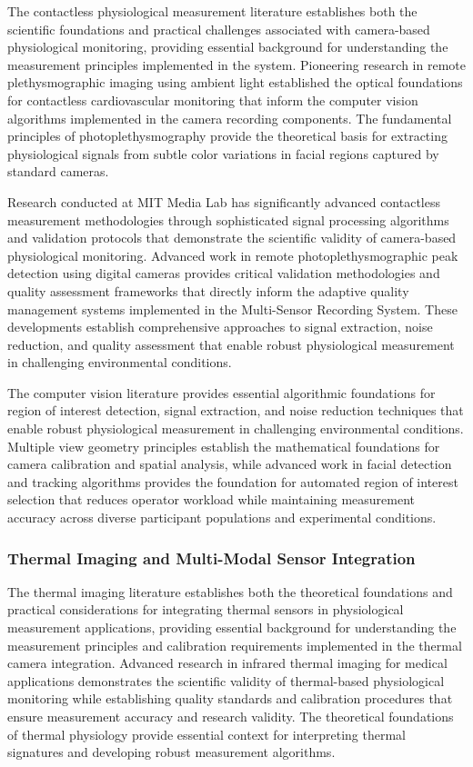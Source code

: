 \documentclass[11pt,a4paper]{article}
\begin{document}
The contactless physiological measurement literature establishes both the scientific foundations and practical
challenges associated with camera-based physiological monitoring, providing essential background for understanding the
measurement principles implemented in the system. Pioneering research in remote plethysmographic imaging using ambient
light established the optical foundations for contactless cardiovascular monitoring that inform the computer vision
algorithms implemented in the camera recording components. The fundamental principles of photoplethysmography provide
the theoretical basis for extracting physiological signals from subtle color variations in facial regions captured by
standard cameras.

Research conducted at MIT Media Lab has significantly advanced contactless measurement methodologies through
sophisticated signal processing algorithms and validation protocols that demonstrate the scientific validity of
camera-based physiological monitoring. Advanced work in remote photoplethysmographic peak detection using digital
cameras provides critical validation methodologies and quality assessment frameworks that directly inform the adaptive
quality management systems implemented in the Multi-Sensor Recording System. These developments establish comprehensive
approaches to signal extraction, noise reduction, and quality assessment that enable robust physiological measurement in
challenging environmental conditions.

The computer vision literature provides essential algorithmic foundations for region of interest detection, signal
extraction, and noise reduction techniques that enable robust physiological measurement in challenging environmental
conditions. Multiple view geometry principles establish the mathematical foundations for camera calibration and spatial
analysis, while advanced work in facial detection and tracking algorithms provides the foundation for automated region
of interest selection that reduces operator workload while maintaining measurement accuracy across diverse participant
populations and experimental conditions.

\subsubsection{Thermal Imaging and Multi-Modal Sensor Integration}

The thermal imaging literature establishes both the theoretical foundations and practical considerations for integrating
thermal sensors in physiological measurement applications, providing essential background for understanding the
measurement principles and calibration requirements implemented in the thermal camera integration. Advanced research in
infrared thermal imaging for medical applications demonstrates the scientific validity of thermal-based physiological
monitoring while establishing quality standards and calibration procedures that ensure measurement accuracy and research
validity. The theoretical foundations of thermal physiology provide essential context for interpreting thermal
signatures and developing robust measurement algorithms.
\end{document}
